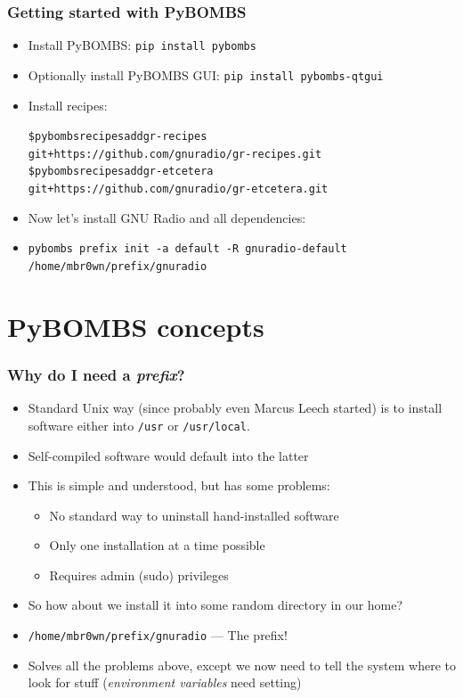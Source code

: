 \documentclass{beamer}
\begin{document}
\begin{frame}
  \frametitle{Getting started with PyBOMBS}
  \begin{itemize}
    \item Install PyBOMBS\@: \texttt{pip install pybombs}
    \item Optionally install PyBOMBS GUI\@: \texttt{pip install pybombs-qtgui}
    \item Install recipes:
      {\footnotesize{%
\begin{alltt}
\$ pybombs recipes add gr-recipes  \\
git+https://github.com/gnuradio/gr-recipes.git \\
\$ pybombs recipes add gr-etcetera\\
git+https://github.com/gnuradio/gr-etcetera.git
\end{alltt}
}}
    \item Now let's install GNU Radio and all dependencies:
    \item {\footnotesize{\texttt{pybombs prefix init -a default -R gnuradio-default /home/mbr0wn/prefix/gnuradio}}}
  \end{itemize}
\end{frame}

\section{PyBOMBS concepts}
\begin{frame}
  \frametitle{Why do I need a \emph{prefix}?}
  \begin{itemize}
    \item Standard Unix way (since probably even Marcus Leech started) is to install software either into \texttt{/usr} or \texttt{/usr/local}.
    \item Self-compiled software would default into the latter
    \item This is simple and understood, but has some problems:
    \begin{itemize}
      \item No standard way to uninstall hand-installed software
      \item Only one installation at a time possible
      \item Requires admin (sudo) privileges
    \end{itemize}
    \item So how about we install it into some random directory in our home?
    \item \texttt{/home/mbr0wn/prefix/gnuradio} --- The prefix!
    \item Solves all the problems above, except we now need to tell the system where to look for stuff (\emph{environment variables} need setting)
  \end{itemize}
\end{frame}
\end{document}
